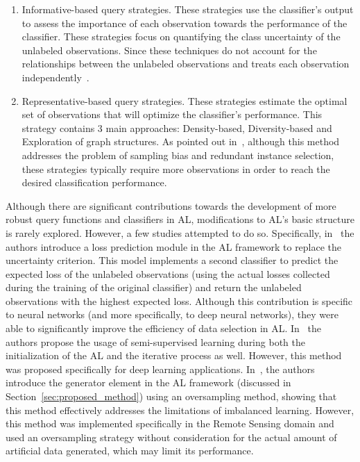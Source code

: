 \documentclass[parskip=full]{scrartcl}
\begin{document}
\begin{enumerate}

    \item Informative-based query strategies. These strategies use the
        classifier's output to assess the importance of each observation
        towards the performance of the classifier. These strategies focus on
        quantifying the class uncertainty of the unlabeled observations.
        Since these techniques do not account for the relationships between
        the unlabeled observations and treats each observation
        independently~\cite{Fu2013}.

    \item Representative-based query strategies. These strategies estimate the
        optimal set of observations that will optimize the classifier's
        performance. This strategy contains 3 main approaches: Density-based,
        Diversity-based and Exploration of graph structures. As pointed out
        in~\cite{Kumar2020}, although this method addresses the problem of
        sampling bias and redundant instance selection, these strategies
        typically require more observations in order to reach the desired
        classification performance.

\end{enumerate}

Although there are significant contributions towards the development of more
robust query functions and classifiers in AL, modifications to AL's basic
structure is rarely explored. However, a few studies attempted to do so.
Specifically, in~\cite{Yoo2019} the authors introduce a loss prediction module
in the AL framework to replace the uncertainty criterion. This model
implements a second classifier to predict the expected loss of the unlabeled
observations (using the actual losses collected during the training of the
original classifier) and return the unlabeled observations with the highest
expected loss. Although this contribution is specific to neural networks (and
more specifically, to deep neural networks), they were able to significantly
improve the efficiency of data selection in AL\@. In~\cite{Simeoni2020} the
authors propose the usage of semi-supervised learning during both the
initialization of the AL and the iterative process as well. However, this
method was proposed specifically for deep learning applications.
In~\cite{Fonseca2021}, the authors introduce the generator element in the AL
framework (discussed in Section~\ref{sec:proposed_method}) using an
oversampling method, showing that this method effectively addresses the
limitations of imbalanced learning.  However, this method was implemented
specifically in the Remote Sensing domain and used an oversampling strategy
without consideration for the actual amount of artificial data generated,
which may limit its performance.
\end{document}
